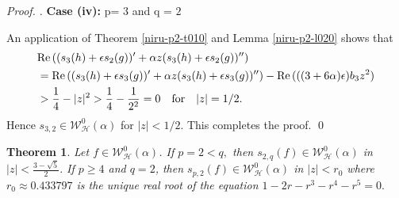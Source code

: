 \documentclass[a4paper,12pt]{amsart}
\theoremstyle{plain}
\newtheorem{thm}[equation]{Theorem}
\theoremstyle{definition}
\newenvironment{pf}[1][]{ \vskip 3mm
 \noindent
 \ifthenelse{\equal{#1}{}}  {{\slshape Proof. }}  {{\slshape #1.} } }{\qed\bigskip}
\begin{document}
\begin{pf}
{\bf Case (iv):} p= $3$ and q = $2$

An application of Theorem \ref{niru-p2-t010} and Lemma \ref{niru-p2-l020} shows that
\begin{align*}
&{\rm Re\,}((s_3(h) + \epsilon s_2(g))' + \alpha z (s_3(h) + \epsilon s_2(g))'')\\
& ={\rm Re\,}((s_3(h) + \epsilon s_3(g))' + \alpha z (s_3(h) + \epsilon s_3(g))'') - {\rm Re\,}(((3 + 6 \alpha)\epsilon)b_3 z^2)\\
& > \frac{1}{4} - |z|^2 >  \frac{1}{4} - \frac{1}{2^2} = 0 \quad \mbox{for}\quad |z|= 1/2.
\end{align*}
Hence  $s_{3, 2}\in\mathcal{W}^0_{\mathcal{H}}(\alpha)$ for $|z|< 1/2.$ This completes the proof.
\end{pf}

\begin{thm}
Let $f\in\mathcal{W}^0_{\mathcal{H}}(\alpha)$. If $p = 2 < q,$ then $s_{2,q}(f)\in\mathcal{W}^0_{\mathcal{H}}(\alpha)$ in  $|z|< \frac{3 - \surd5}{2}.$
If $p\geq 4$ and $q =2$, then $s_{p,2}(f)\in\mathcal{W}^0_{\mathcal{H}}(\alpha)$ in  $|z|< r_{0}$ where $r_{0} \approx 0.433797$ is the unique real root of the equation $1 - 2r -r^3 - r^4 - r^5 = 0.$
\end{thm}
\end{document}
